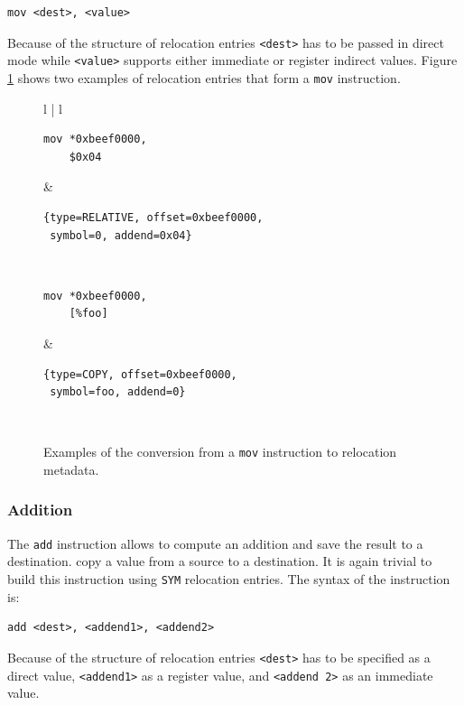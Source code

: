 \documentclass[11pt,twoside,a4paper]{article}
\begin{document}
\begin{lstlisting}
mov <dest>, <value>
\end{lstlisting}

Because of the structure of relocation entries \texttt{<dest>} has to be passed in direct mode while \texttt{<value>} supports either immediate or register indirect values. Figure \ref{mov_table} shows two examples of relocation entries that form a \texttt{mov} instruction.

\begin{figure}[ht]
\centering
\begin{tabular}{ l | l }
  \hline
\begin{lstlisting}
mov *0xbeef0000,
    $0x04
\end{lstlisting}
&
\begin{lstlisting}
{type=RELATIVE, offset=0xbeef0000,
 symbol=0, addend=0x04}
\end{lstlisting} \\
  \hline
\begin{lstlisting}
mov *0xbeef0000,
    [%foo]
\end{lstlisting}
&
\begin{lstlisting}
{type=COPY, offset=0xbeef0000,
 symbol=foo, addend=0}
\end{lstlisting} \\
  \hline
\end{tabular}
\caption{Examples of the conversion from a \texttt{mov} instruction to relocation metadata.}
\vspace{-0.4cm}
\label{mov_table}
\end{figure}

\subsubsection{Addition}
The \texttt{add} instruction allows to compute an addition and save the result to a destination. copy a value from a source to a destination. It is again trivial to build this instruction using \texttt{SYM} relocation entries. The syntax of the instruction is:

\begin{lstlisting}
add <dest>, <addend1>, <addend2>
\end{lstlisting}

Because of the structure of relocation entries  \texttt{<dest>} has to be specified as a direct value, \texttt{<addend1>} as a register value, and \texttt{<addend 2>} as an immediate value.
\end{document}
